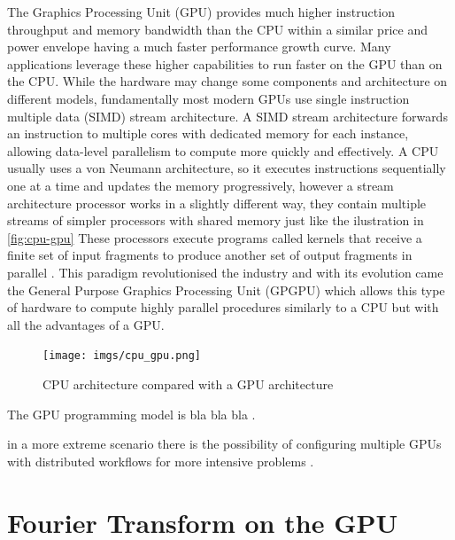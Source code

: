 \documentclass[
  oneside,
  11pt, a4paper,
  footinclude=true,
  headinclude=true,
  cleardoublepage=empty
]{scrbook}
\begin{document}

The Graphics Processing Unit (GPU) provides much higher instruction throughput and memory bandwidth than the CPU within a similar price and power envelope having a much faster performance growth curve. Many applications leverage these higher capabilities to run faster on the GPU than on the CPU. While the hardware may change some components and architecture on different models, fundamentally most modern GPUs use single instruction multiple data (SIMD) stream architecture.
A SIMD stream architecture forwards an instruction to multiple cores with dedicated memory for each instance, allowing data-level parallelism to compute more quickly and effectively.
A CPU usually uses a von Neumann architecture, so it executes instructions sequentially one at a time and updates the memory progressively, however a stream architecture processor works in a slightly different way, they contain multiple streams of simpler processors with shared memory just like the ilustration in \autoref{fig:cpu-gpu} These processors execute programs called kernels that receive a finite set of input fragments to produce another set of output fragments in parallel \cite{fernando2004gpu}. This paradigm revolutionised the industry and with its evolution came the General Purpose Graphics Processing Unit (GPGPU) which allows this type of hardware to compute highly parallel procedures similarly to a CPU but with all the advantages of a GPU. 

\begin{figure}[h]  \label{fig:cpu-gpu}
    \centering
    \texttt{[image: imgs/cpu\_gpu.png]}
    \caption{CPU architecture compared with a GPU architecture}
    \label{fig:signal-decomposition}
\end{figure}


The GPU programming model is bla bla bla \cite{CUDAcppguide}.

in a more extreme scenario there is the possibility of configuring multiple GPUs with distributed workflows for more intensive problems \cite{heldens2022lightning}.




\section{Fourier Transform on the GPU}
\end{document}

